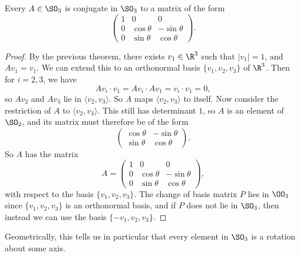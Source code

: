 \documentclass[a4paper]{scrartcl}
\begin{document}
\begin{corollary}
	Every $A \in \SO_3$ is conjugate in $\SO_3$ to a matrix of the form
	$$
	\begin{pmatrix}
		1 & 0 & 0 \\
		0 & \cos \theta & - \sin \theta \\
		0 & \sin \theta & \cos \theta
	\end{pmatrix}.
	$$
\end{corollary}
\begin{proof}
	By the previous theorem, there exists $v_1 \in \R^3$ such that $|v_1| = 1$, and $Av_1 = v_1$. We can extend this to an orthonormal basis $\{v_1, v_2, v_3\}$ of $\R^3$. Then for $i = 2, 3$, we have 
	$$
Av_i \cdot v_1 = A v_i \cdot Av_1 = v_i \cdot v_1 = 0,
	$$
	so $Av_2$ and $Av_3$ lie in $\langle v_2, v_3 \rangle$. So $A$ maps $\langle v_2, v_3 \rangle$ to itself. Now consider the restriction of $A$ to $\langle v_2, v_3 \rangle$. This still has determinant $1$, so $A$ is an element of $\SO_2$, and its matrix must therefore be of the form
	$$
	\begin{pmatrix}
		\cos \theta & - \sin \theta \\
		\sin \theta & \cos \theta
	\end{pmatrix}.
	$$
	So $A$ has the matrix
	$$
A = \begin{pmatrix}
	1 & 0 & 0 \\
	0 & \cos \theta & - \sin \theta \\
	0 & \sin \theta & \cos \theta
\end{pmatrix},
	$$
	with respect to the basis $\{v_1, v_2, v_3\}$. The change of basis matrix $P$ lies in $\OO_3$ since $\{v_1, v_2, v_3\}$ is an orthonormal basis, and if $P$ does not lie in $\SO_3$, then instead we can use the basis $\{-v_1, v_2, v_3\}$.
\end{proof}

Geometrically, this tells us in particular that every element in $\SO_3$ is a rotation about some axis. 
\end{document}
